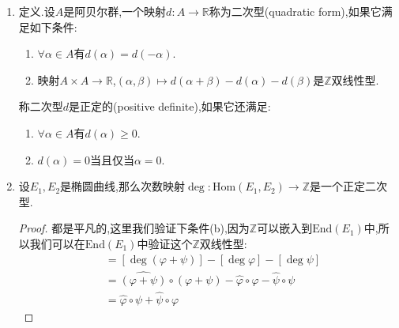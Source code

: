\begin{enumerate}
\begin{proof}
		(c)是平凡的,我们先承认(d)成立【】.那么按照$\widehat{[1]}=[1]$,归纳就有$\widehat{[m+1]}=\widehat{[m]}+\widehat{[1]}=[m+1]$.另一方面我们有$[m^2]=\widehat{[m]}\circ[m]=[\deg[m]]$,于是$\deg[m]=m^2$,这解决了(b).最后设$m=\deg\varphi$,那么有$m^2=\deg[m]=\deg(\widehat{\varphi}\circ\varphi)=(\deg\varphi)(\deg\widehat{\varphi})=m\deg\widehat{\varphi}$,进而得到$\deg\widehat{\varphi}=m=\deg\varphi$.另外按照$\varphi\circ\widehat{\varphi}\circ\varphi=\varphi\circ[m]=[m]\circ\varphi$得到$\left(\varphi\circ\widehat{\varphi}-[m]\right)\circ\varphi=[0]$,不妨设$\varphi$是非常值的(因为常值的时候明显有$\widehat{[0]}=[0]$,此时(a)是平凡的),于是它是满射,于是$\varphi\circ\widehat{\varphi}=[m]$,这解决了(a).
	\end{proof}
	\item 定义.设$A$是阿贝尔群,一个映射$d:A\to\mathbb{R}$称为二次型(quadratic form),如果它满足如下条件:
	\begin{enumerate}
		\item $\forall\alpha\in A$有$d(\alpha)=d(-\alpha)$.
		\item 映射$A\times A\to\mathbb{R}$,$(\alpha,\beta)\mapsto d(\alpha+\beta)-d(\alpha)-d(\beta)$是$\mathbb{Z}$双线性型.
	\end{enumerate}
	
	称二次型$d$是正定的(positive definite),如果它还满足:
	\begin{enumerate}[start=3]
		\item $\forall\alpha\in A$有$d(\alpha)\ge0$.
		\item $d(\alpha)=0$当且仅当$\alpha=0$.
	\end{enumerate}
	\item 设$E_1,E_2$是椭圆曲线,那么次数映射$\deg:\mathrm{Hom}(E_1,E_2)\to\mathbb{Z}$是一个正定二次型.
	\begin{proof}
		
		都是平凡的,这里我们验证下条件(b),因为$\mathbb{Z}$可以嵌入到$\mathrm{End}(E_1)$中,所以我们可以在$\mathrm{End}(E_1)$中验证这个$\mathbb{Z}$双线性型:
		\begin{align*}
			[\deg(\varphi+\psi)-\deg\varphi-\deg\psi]&=[\deg(\varphi+\psi)]-[\deg\varphi]-[\deg\psi]\\&=\widehat{(\varphi+\psi)}\circ(\varphi+\psi)-\widehat{\varphi}\circ\varphi-\widehat{\psi}\circ\psi\\&=\widehat{\varphi}\circ\psi+\widehat{\psi}\circ\varphi
		\end{align*}
		

\end{proof}
\end{enumerate}
